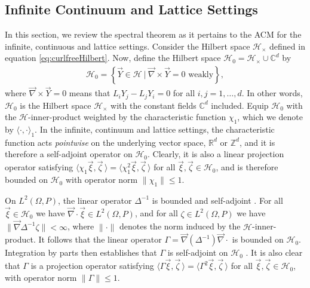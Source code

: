 \documentclass{cmslatex}
\begin{document}
\subsection{Infinite Continuum and Lattice Settings}
\label{sec:The_Spectral_Theorem_Continuum} 
%
In this section, we review the spectral theorem as it pertains to the
ACM for the infinite, continuous and lattice settings. Consider the
Hilbert space $\mathscr{H}_\times$ defined in equation
\eqref{eq:curlfreeHilbert}. Now, define the Hilbert space
$\mathscr{H}_0=\mathscr{H}_\times\cup\mathbb{C}^d$ by 
%
\begin{align}\label{eq:Hilbert0}
  \mathscr{H}_0=
  \left\{\vec{Y}\in \mathscr{H} \ | \ \vec{\nabla} \times\vec{Y}=0 \text{ weakly}
  \right\},
\end{align}
%
where $\vec{\nabla} \times\vec{Y}=0$ means that $L_iY_j-L_jY_i=0$ for all $i,j=1,\ldots,d$.
In other words, $\mathscr{H}_0$ is the Hilbert space $\mathscr{H}_\times$
with the constant fields $\mathbb{C}^d$ included. Equip $\mathscr{H}_0$ with the
$\mathscr{H}$-inner-product weighted by the characteristic function 
$\chi_1$, which we denote by $\langle\cdot,\cdot\rangle_1$. In the infinite, continuum and 
lattice settings, the characteristic function acts \emph{pointwise} on
the underlying vector space, $\mathbb{R}^d$ or $\mathbb{Z}^d$, and it is
therefore a self-adjoint operator on $\mathscr{H}_0$. Clearly, it is
also a linear projection operator satisfying
$\langle\chi_1\vec{\xi},\vec{\zeta}\,\rangle=\langle\chi_1^2\vec{\xi},\vec{\zeta}\,\rangle$ for all
$\vec{\xi},\vec{\zeta}\in\mathscr{H}_0$, and is therefore bounded on
$\mathscr{H}_0$ with operator norm $\|\chi_1\|\leq1$.

On $L^2(\Omega,P)$, the linear operator $\Delta^{-1}$ is bounded and self-adjoint 
\cite{Stakgold:BVP:2000}. For all $\vec{\xi}\in\mathscr{H}_0$ we
have $\vec{\nabla}\cdot\vec{\xi}\in L^2(\Omega,P)$, and for all $\zeta\in L^2(\Omega,P)$ we have
$\|\vec{\nabla}\Delta^{-1}\zeta\|<\infty$, where $\|\cdot\|$ denotes the norm induced by the
$\mathscr{H}$-inner-product. It follows that  the linear operator
$\Gamma=\vec{\nabla}(\Delta^{-1})\vec{\nabla}\cdot$ is bounded on
$\mathscr{H}_0$. Integration by parts then
establishes that $\Gamma$ is self-adjoint on $\mathscr{H}_0$
\cite{Golden:CMP-473}. It is also clear that $\Gamma$ is a 
projection operator satisfying
$\langle\Gamma\vec{\xi},\vec{\zeta}\,\rangle=\langle\Gamma^2\vec{\xi},\vec{\zeta}\,\rangle$ for all
$\vec{\xi},\vec{\zeta}\in\mathscr{H}_0$, with operator norm $\|\Gamma\|\leq1$.  
\end{document}

